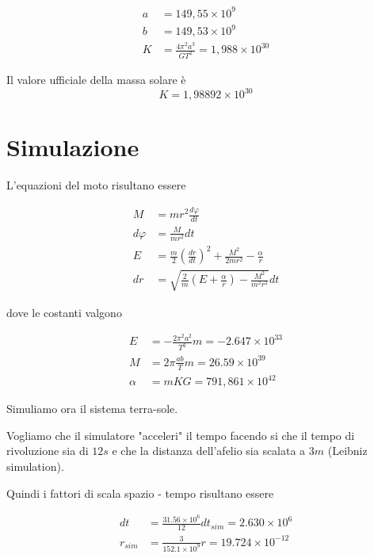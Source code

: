 \documentclass[a4paper,11pt]{article}
\begin{document}
\begin{align*}
	a & = 149,55 \times 10^9 \\
	b & = 149,53 \times 10^9 \\
	K & = \frac{4 \pi^2 a^3}{GT^2} = 1,988 \times 10^{30}
\end{align*}

Il valore ufficiale della massa solare è
\[
	K = 1,98892 \times 10^{30}
\]

\section{Simulazione}

L'equazioni del moto risultano essere

\begin{align*}
    M & = m r^2 \frac{d \varphi}{dt}  \\
    d \varphi & = \frac{M}{m r^2} dt \\
	E & = \frac{m}{2} \left( \frac{dr}{dt} \right) ^2 + \frac{M^2}{2 m r^2} - \frac{\alpha}{r}\\
	dr & = \sqrt{\frac{2}{m} \left( E + \frac{\alpha}{r} \right) - \frac{M^2}{m^2 r^2} } dt
\end{align*}

dove le costanti valgono

\begin{align*}
	E & = - \frac{2 \pi^2 a^2}{T^2} m = -2.647 \times 10^{33} \\
	M & = 2 \pi \frac{ab}{T} m = 26.59 \times 10^{39} \\
	\alpha & = mKG = 791,861 \times 10^{42}
\end{align*}

Simuliamo ora il sistema terra-sole.

Vogliamo che il simulatore "acceleri" il tempo facendo si che il tempo di rivoluzione sia di $ 12 s $
e che la distanza dell'afelio sia scalata a $3 m$ (Leibniz simulation).

Quindi i fattori di scala spazio - tempo risultano essere

\begin{align*}
	dt & = \frac{31.56 \times 10^6}{12} dt_{sim} = 2.630 \times 10^6\\
	r_{sim} & = \frac{3}{152.1 \times 10^9} r = 19.724 \times 10^{-12}
\end{align*}
\end{document}
